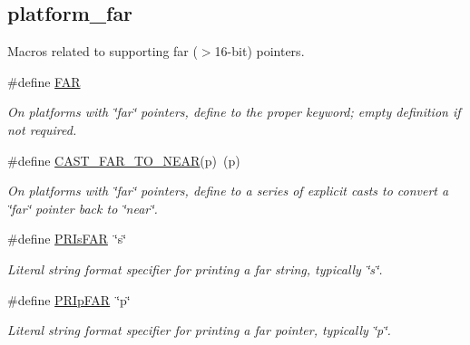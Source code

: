 \subsection*{platform\+\_\+far}
\label{_amgrpa1b148d56cbfc1db797440591bed5acf}%
Macros related to supporting far ($>$16-\/bit) pointers. \begin{DoxyCompactItemize}
\item 
\mbox{\label{group__hal_gaef060b3456fdcc093a7210a762d5f2ed}} 
\#define \hyperlink{group__hal_gaef060b3456fdcc093a7210a762d5f2ed}{F\+AR}
\begin{DoxyCompactList}\small\item\em On platforms with \char`\"{}far\char`\"{} pointers, define to the proper keyword; empty definition if not required. \end{DoxyCompactList}\item 
\#define \hyperlink{group__hal_ga0220c5cb877cc5718402ab41b91b7252}{C\+A\+S\+T\+\_\+\+F\+A\+R\+\_\+\+T\+O\+\_\+\+N\+E\+AR}(p)~(p)
\begin{DoxyCompactList}\small\item\em On platforms with \char`\"{}far\char`\"{} pointers, define to a series of explicit casts to convert a \char`\"{}far\char`\"{} pointer back to \char`\"{}near\char`\"{}. \end{DoxyCompactList}\item 
\mbox{\label{group__hal_ga379022d2cd3136d8f3500c88658056b7}} 
\#define \hyperlink{group__hal_ga379022d2cd3136d8f3500c88658056b7}{P\+R\+Is\+F\+AR}~\char`\"{}s\char`\"{}
\begin{DoxyCompactList}\small\item\em Literal string format specifier for printing a far string, typically {\ttfamily \char`\"{}s\char`\"{}}. \end{DoxyCompactList}\item 
\mbox{\label{group__hal_ga8429a3beb3448b89cb7c3877b8909369}} 
\#define \hyperlink{group__hal_ga8429a3beb3448b89cb7c3877b8909369}{P\+R\+Ip\+F\+AR}~\char`\"{}p\char`\"{}
\begin{DoxyCompactList}\small\item\em Literal string format specifier for printing a far pointer, typically {\ttfamily \char`\"{}p\char`\"{}}. \end{DoxyCompactList}\end{DoxyCompactItemize}
